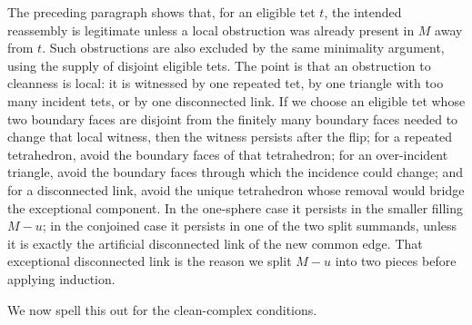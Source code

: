 \documentclass[12pt]{article}
\begin{document}
The preceding paragraph shows that, for an eligible tet $t$, the intended
reassembly is legitimate unless a local obstruction was already present in
$M$ away from $t$.  Such obstructions are also excluded by the same
minimality argument, using the supply of disjoint eligible tets.  The point
is that an obstruction to cleanness is local: it is witnessed by one repeated
tet, by one triangle with too many incident tets, or by one disconnected
link.  If we choose an eligible tet whose two boundary faces are disjoint from
the finitely many boundary faces needed to change that local witness, then
the witness persists after the flip; for a repeated tetrahedron, avoid the
boundary faces of that tetrahedron; for an over-incident triangle, avoid the
boundary faces through which the incidence could change; and for a
disconnected link, avoid the unique tetrahedron whose removal would bridge the
exceptional component.  In the one-sphere case it persists in the smaller filling
$M-u$; in the conjoined case it persists in one of the two split summands,
unless it is exactly the artificial disconnected link of the new common edge.
That exceptional disconnected link is the reason we split $M-u$ into two
pieces before applying induction.

We now spell this out for the clean-complex conditions.
\end{document}
